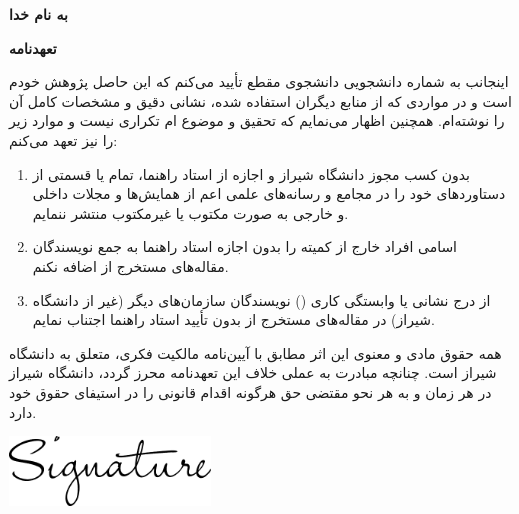 \centerline{\textbf{به نام خدا}}

\vspace{\baselineskip}
\centerline{\textbf{تعهدنامه}}

\vspace{\baselineskip}
اینجانب {\PersianName} به شماره دانشجویی {\PersianStudentNumber} دانشجوی مقطع {\PersianDegree} تأیید می‌کنم که این {\PersianType} حاصل پژوهش خودم است و در مواردی که از منابع دیگران استفاده شده، نشانی دقیق و مشخصات کامل آن را نوشته‌ام. همچنین اظهار می‌نمایم که تحقیق و موضوع {\PersianType}‌ام تکراری نیست و موارد زیر را نیز تعهد می‌کنم:

\begin{enumerate}[label=\arabic*-]
    \item بدون کسب مجوز دانشگاه شیراز و اجازه از استاد راهنما، تمام یا قسمتی از دستاوردهای {\PersianType} خود را در مجامع و رسانه‌های علمی اعم از همایش‌ها و مجلات داخلی و خارجی به صورت مکتوب یا غیرمکتوب منتشر ننمایم.
    \item اسامی افراد خارج از کمیته {\PersianType} را بدون اجازه استاد راهنما به جمع نویسندگان مقاله‌های مستخرج از {\PersianType} اضافه نکنم.
    \item از درج نشانی یا وابستگی کاری () نویسندگان سازمان‌های دیگر (غیر از دانشگاه شیراز) در مقاله‌های مستخرج از {\PersianType} بدون تأیید استاد راهنما اجتناب نمایم.
\end{enumerate}

همه حقوق مادی و معنوی این اثر مطابق با آیین‌نامه مالکیت فکری، متعلق به دانشگاه شیراز است. چنانچه مبادرت به عملی خلاف این تعهدنامه محرز گردد، دانشگاه شیراز در هر زمان و به هر نحو مقتضی حق هرگونه اقدام قانونی را در استیفای حقوق خود دارد.

\vspace{2\baselineskip}
\centerline{\PersianName}
\centerline{\PersianDefenseDate}
\centerline{\includegraphics[width=0.4\textwidth]{assets/signature}}
